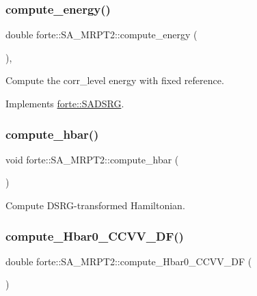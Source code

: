 \subsubsection{\texorpdfstring{compute\+\_\+energy()}{compute\_energy()}}
{\footnotesize\ttfamily double forte\+::\+S\+A\+\_\+\+M\+R\+P\+T2\+::compute\+\_\+energy (\begin{DoxyParamCaption}{ }\end{DoxyParamCaption})\hspace{0.3cm}{\ttfamily [override]}, {\ttfamily [virtual]}}



Compute the corr\+\_\+level energy with fixed reference. 



Implements \mbox{\hyperlink{classforte_1_1_s_a_d_s_r_g_aa3716848c396b296b99fff8d48751fd8}{forte\+::\+S\+A\+D\+S\+RG}}.

\mbox{\label{classforte_1_1_s_a___m_r_p_t2_ad129f5985d7f9d66fbc3f0d69a0f61ff}} 
\subsubsection{\texorpdfstring{compute\+\_\+hbar()}{compute\_hbar()}}
{\footnotesize\ttfamily void forte\+::\+S\+A\+\_\+\+M\+R\+P\+T2\+::compute\+\_\+hbar (\begin{DoxyParamCaption}{ }\end{DoxyParamCaption})\hspace{0.3cm}{\ttfamily [protected]}}



Compute D\+S\+R\+G-\/transformed Hamiltonian. 

\mbox{\label{classforte_1_1_s_a___m_r_p_t2_ae880649a8c0717cf7f0edcebec9c4198}} 
\subsubsection{\texorpdfstring{compute\+\_\+\+Hbar0\+\_\+\+C\+C\+V\+V\+\_\+\+D\+F()}{compute\_Hbar0\_CCVV\_DF()}}
{\footnotesize\ttfamily double forte\+::\+S\+A\+\_\+\+M\+R\+P\+T2\+::compute\+\_\+\+Hbar0\+\_\+\+C\+C\+V\+V\+\_\+\+DF (\begin{DoxyParamCaption}{ }\end{DoxyParamCaption})\hspace{0.3cm}{\ttfamily [protected]}}



